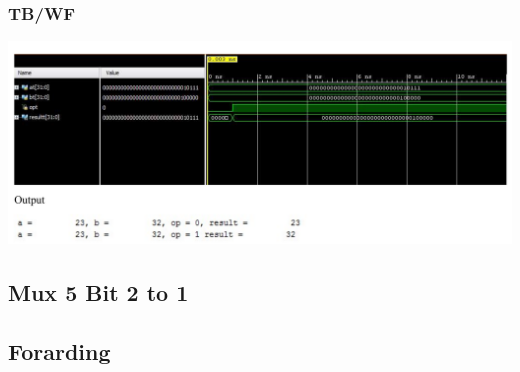 \documentclass{llncs}
\begin{document}
\subsubsection{TB/WF} 
\begin{addmargin}[-5em]{-6em}
  
\end{addmargin}
\includegraphics[scale=.2]{images/mux32.png}





\subsection{Mux 5 Bit 2 to 1}
\begin{addmargin}[-5em]{-6em}
  
    
\end{addmargin}

\subsection{Forarding}
\label{f:1}
\begin{addmargin}[-5em]{-6em}
  
\end{addmargin}
\end{document}

